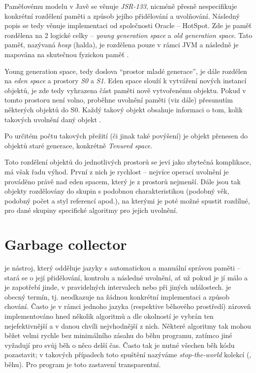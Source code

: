 Paměťovému modelu v Javě se věnuje \textit{JSR-133}, nicméně přesně nespecifikuje konkrétní rozdělení paměti a způsob jejího přidělování a uvolňování. Následný popis se tedy věnuje implementaci od společnosti Oracle – HotSpot. Zde je paměť rozdělena na 2 logické celky – \textit{young generation space} a \textit{old generation space}. Tato paměť, nazývaná \textit{heap} (halda), je rozdělena pouze v rámci JVM a následně je mapována na skutečnou fyzickou paměť \cite{jsr133}.

Young generation space, tedy doslova “prostor mladé generace”, je dále rozdělen na \textit{eden space} a prostory \textit{S0} a \textit{S1}. Eden space slouží k vytváření nových instancí objektů, je zde tedy vyhrazena část paměti nově vytvořenému objektu. Pokud v tomto prostoru není volno, proběhne uvolnění paměti (viz dále) přesunutím některých objektů do S0. Každý takový objekt obsahuje informaci o tom, kolik takových uvolnění daný objekt .

Po určitém počtu takových přežití (či jinak také povýšení) je objekt přenesen do objektů staré generace, konkrétně \textit{Tenured space}.

Toto rozdělení objektů do jednotlivých prostorů se jeví jako zbytečná komplikace, má však řadu výhod. První z nich je rychlost – nejvíce operací uvolnění je prováděno právě nad eden spacem, který je z prostorů nejmenší. Dále jsou tak objekty rozdělovány do skupin s podobnou charakteristikou (podobný věk, podobný počet a styl referencí apod.), na kterými je poté možné spustit rozdílné, pro dané skupiny specifické algoritmy pro jejich uvolnění.

\section{Garbage collector}
 je nástroj, který odděluje jazyky s automatickou a manuální správou paměti – stará se o její přidělování, kontrolu a následné uvolnění, ať už pokud je jí málo a je zapotřebí jinde, v pravidelných intervalech nebo při jiných událostech.  je obecný termín, tj. neodkazuje na žádnou konkrétní implementaci a způsob chování. Často je v rámci jednoho jazyka (respektive běhového prostředí) zároveň implementováno hned několik algoritmů  a dle okolností je vybrán ten nejefektivnější a v danou chvíli nejvhodnější z nich. Některé algoritmy tak mohou běžet velmi rychle bez minimálního zásahu do běhu programu, zatímco jiné vyžadují pro svůj běh o něco delší čas. Často tak je nutné všechen běh kódu pozastavit; v takových případech toto spuštění  nazýváme \textit{stop-the-world} kolekcí (, běhu). Pro program je toto zastavení transparentní.

